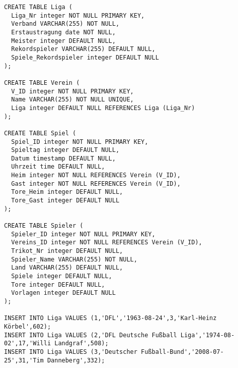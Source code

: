 \documentclass{lehramt-informatik-aufgabe}
\begin{document}
\begin{verbatim}
CREATE TABLE Liga (
  Liga_Nr integer NOT NULL PRIMARY KEY,
  Verband VARCHAR(255) NOT NULL,
  Erstaustragung date NOT NULL,
  Meister integer DEFAULT NULL,
  Rekordspieler VARCHAR(255) DEFAULT NULL,
  Spiele_Rekordspieler integer DEFAULT NULL
);

CREATE TABLE Verein (
  V_ID integer NOT NULL PRIMARY KEY,
  Name VARCHAR(255) NOT NULL UNIQUE,
  Liga integer DEFAULT NULL REFERENCES Liga (Liga_Nr)
);

CREATE TABLE Spiel (
  Spiel_ID integer NOT NULL PRIMARY KEY,
  Spieltag integer DEFAULT NULL,
  Datum timestamp DEFAULT NULL,
  Uhrzeit time DEFAULT NULL,
  Heim integer NOT NULL REFERENCES Verein (V_ID),
  Gast integer NOT NULL REFERENCES Verein (V_ID),
  Tore_Heim integer DEFAULT NULL,
  Tore_Gast integer DEFAULT NULL
);

CREATE TABLE Spieler (
  Spieler_ID integer NOT NULL PRIMARY KEY,
  Vereins_ID integer NOT NULL REFERENCES Verein (V_ID),
  Trikot_Nr integer DEFAULT NULL,
  Spieler_Name VARCHAR(255) NOT NULL,
  Land VARCHAR(255) DEFAULT NULL,
  Spiele integer DEFAULT NULL,
  Tore integer DEFAULT NULL,
  Vorlagen integer DEFAULT NULL
);

INSERT INTO Liga VALUES (1,'DFL','1963-08-24',3,'Karl-Heinz Körbel',602);
INSERT INTO Liga VALUES (2,'DFL Deutsche Fußball Liga','1974-08-02',17,'Willi Landgraf',508);
INSERT INTO Liga VALUES (3,'Deutscher Fußball-Bund','2008-07-25',31,'Tim Danneberg',332);


\end{verbatim}
\end{document}
